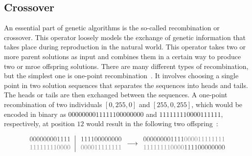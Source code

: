 \documentclass[paper=a4,%
  twoside,%
  BCOR4mm,%
  abstract=true,%
  toc=bibliography,%
  chapterprefix=true,%
  toc=bibliographynumbered,%
  open=right,%
  english,%
  pagesize=pdftex]{scrreprt}
\begin{document}
\subsection{Crossover}
\label{sec:background-crossover}
An essential part of genetic algorithms is the so-called recombination or crossover. This operator loosely models the exchange of genetic information that takes place during reproduction in the natural world. This operator takes two or more parent solutions as input and combines them in a certain way to produce two or mroe offspring solutions. There are many different types of recombination, but the simplest one is one-point recombination~\cite{McMinn_2004}. It involves choosing a single point in two solution sequences that separates the sequences into heads and tails. The heads or tails are then exchanged between the  sequences. A one-point recombination of two individuals $[0, 255, 0]$ and $[255, 0, 255]$, which would be encoded in binary as $0000000011111100000000$ and $111111110000111111$, respectively, at position $12$ would result in the following two offspring~\cite{McMinn_2004}:

\[
\left.\begin{array}{c}
\textcolor{webgreen}{000000001111} \\  %
\textcolor{thesisblue}{111111110000} %
\end{array}\right|
\begin{array}{c}
\textcolor{webgreen}{111100000000} \\  %
\textcolor{thesisblue}{000011111111} %
\end{array} \longrightarrow
\begin{array}{c}
\textcolor{webgreen}{000000001111}\textcolor{thesisblue}{000011111111} \\  %
\textcolor{thesisblue}{111111110000}\textcolor{webgreen}{111100000000} %
\end{array}
\]
\end{document}
